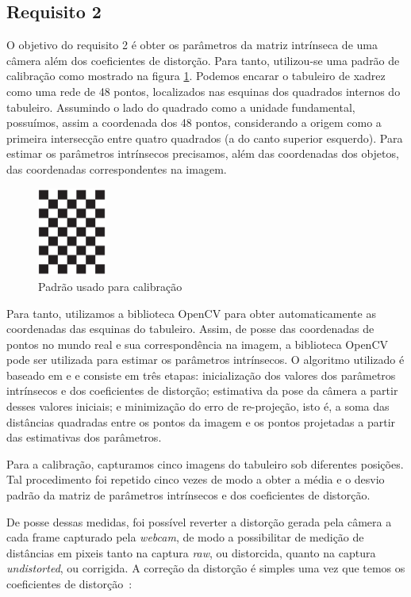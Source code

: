 \documentclass{bmvc2k}
\begin{document}
\subsection{Requisito 2}
O objetivo do requisito 2 é obter os parâmetros da matriz intrínseca de uma câmera além dos coeficientes de distorção. Para tanto, utilizou-se uma padrão de calibração como mostrado na figura \ref{chess}. Podemos encarar o tabuleiro de xadrez como uma rede de 48 pontos, localizados nas esquinas dos quadrados internos do tabuleiro. Assumindo o lado do quadrado como a unidade fundamental, possuímos, assim a coordenada dos 48 pontos, considerando a origem como a primeira intersecção entre quatro quadrados (a do canto superior esquerdo). Para estimar os parâmetros intrínsecos precisamos, além das coordenadas dos objetos, das coordenadas correspondentes na imagem.

\begin{figure}[htb] 
\centering
\includegraphics[width=0.2\textwidth, angle=90]{figs/pattern.pdf}
\caption{Padrão usado para calibração \label{chess}}
\end{figure}

Para tanto, utilizamos a biblioteca OpenCV para obter automaticamente as coordenadas das esquinas do tabuleiro. Assim, de posse das coordenadas de pontos no mundo real e sua correspondência na imagem, a biblioteca OpenCV pode ser utilizada para estimar os parâmetros intrínsecos. O algoritmo utilizado é baseado em \cite{zhang2000flexible} e \cite{bouguet2002camera} e consiste em três etapas:
inicialização dos valores dos parâmetros intrínsecos e dos coeficientes de distorção; estimativa da pose da câmera a partir desses valores iniciais; e minimização do erro de re-projeção, isto é, a soma das distâncias quadradas entre os pontos da imagem e os pontos projetadas a partir das estimativas dos parâmetros.

Para a calibração, capturamos cinco imagens do tabuleiro sob diferentes posições. Tal procedimento foi repetido cinco vezes de modo a obter a média e o desvio padrão da matriz de parâmetros intrínsecos e dos coeficientes de distorção.

De posse dessas medidas, foi possível reverter a distorção gerada pela câmera a cada frame capturado pela \textit{webcam}, de modo a possibilitar de medição de distâncias em pixeis tanto na captura \textit{raw}, ou distorcida, quanto na captura \textit{undistorted}, ou corrigida. A correção da distorção é simples uma vez que temos os coeficientes de distorção~\cite{zhang2000flexible}:
\end{document}
